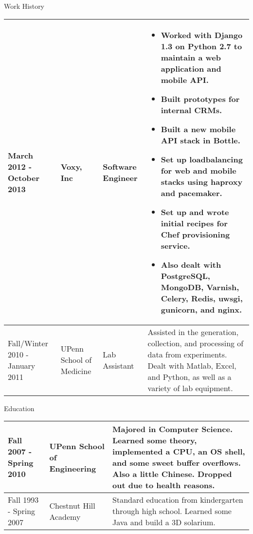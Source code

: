 \documentclass[a4paper]{article}
\begin{document}
    \begin{Large}
    Work History \\
    \end{Large}
    \begin{tabular}{ m{3cm} m{3cm} m{3cm} m{8cm} }
        \hline
        March 2012 - \newline October 2013 & Voxy, Inc & Software Engineer & 
            \begin{itemize}
                \item Worked with Django 1.3 on Python 2.7 to maintain a web application and mobile API.
                \item Built prototypes for internal CRMs.
                \item Built a new mobile API stack in Bottle.
                \item Set up loadbalancing for web and mobile stacks using haproxy and pacemaker.
                \item Set up and wrote initial recipes for Chef provisioning service.
                \item Also dealt with PostgreSQL, MongoDB, Varnish, Celery, Redis, uwsgi, gunicorn, and nginx. 
            \end{itemize}
        \\
        \hline
        Fall/Winter 2010 - January 2011 & UPenn \newline School of Medicine & Lab Assistant & Assisted in the generation, collection, and processing of data from experiments. \newline Dealt with Matlab, Excel, and Python, as well as a variety of lab equipment. \\
        \hline
    \end{tabular}
    \vspace{.3in}

    \begin{Large}
        Education \\
    \end{Large}
    \begin{tabular}{ m{3cm} m{6.45cm} m{8cm} }
        \hline
        Fall 2007 - \newline Spring 2010 & UPenn \newline School of Engineering & Majored in Computer Science. Learned some theory, implemented a CPU, an OS shell, and some sweet buffer overflows. Also a little Chinese. Dropped out due to health reasons. \\
        \hline
        Fall 1993 - \newline Spring 2007 & Chestnut Hill Academy & Standard education from kindergarten through high school. Learned some Java and build a 3D solarium. \\
        \hline
    \end{tabular}
    \vspace{.3in}
    
\end{document}
